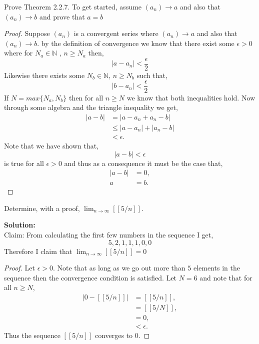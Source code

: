 \documentclass[12pt]{article}
\makeatletter
\theoremstyle{homework}
\newenvironment{exercise}[1]
{\def\@currentlabel{#1}\exercisecore}
{\endexercisecore}
\newcommand{\localhead}[1]{\par\smallskip\noindent\textbf{#1}\nobreak\\}%
\newcommand\solution{\localhead{Solution:}}
\newcommand{\Nats}{\ensuremath{\mathbb N}}
\makeatother
\begin{document}
\begin{exercise}{2.2.6}
Prove Theorem 2.2.7. To get started, assume $(a_n) \to a$ and also that $(a_n) \to b$ and prove that $a = b$
\end{exercise}
\begin{proof} Suppose $(a_n)$ is a convergent series where $(a_n) \to a$ and also that $(a_n) \to b$. by the definition of convergence we know that
	there exist some $\epsilon > 0$ where for $N_a\in \Nats$ , $n \geq N_a$ then, 
	\begin{equation*}
		|a - a_n| < \frac{\epsilon}{2}
	\end{equation*}
	Likewise there exists some $N_b\in \Nats$, $n \geq N_b$ such that,
	\begin{equation*}
		|b - a_n| < \frac{\epsilon}{2}
	\end{equation*} 
	If $N = max\{N_a,N_b\}$ then for all $n \geq N$ we know that both inequalities hold. Now through some algebra and the triangle inequality we get,
	\begin{align*}
		|a - b| &= |a - a_n + a_n - b|\\
		&\le |a - a_n| + |a_n - b|\\
		&< \epsilon.
	\end{align*}
Note that we have shown that, 
\begin{equation*}
	|a - b| < \epsilon
\end{equation*}
is true for all $\epsilon > 0$ and thus as a consequence it must be the case that,
\begin{align*}
	|a - b| &= 0,\\
	a &= b.
\end{align*}
\end{proof}

\begin{exercise}{2.2.5(a)}
Determine, with a proof, $\lim_{n\to\infty} [[5/n]]$.
\end{exercise}
\solution
Claim: From calculating the first few numbers in the sequence I get,
\begin{equation*}
	5,2,1,1,1,0,0
\end{equation*}
Therefore I claim that $\lim_{n\to\infty} [[5/n]] = 0$

\begin{proof} Let $\epsilon > 0$. Note that as long as we go out more than $5$ elements in the sequence then the convergence condition is satisfied. Let $N = 6$ and note that for all $n\geq N$,
	\begin{align*}
		|0 - [[5/n]]| &= [[5/n]],\\
						 &= [[5/N]],\\
						 &= 0,\\
						 &< \epsilon.
	\end{align*} 
Thus the sequence $[[5/n]]$ converges to 0.
\end{proof}
\end{document}
